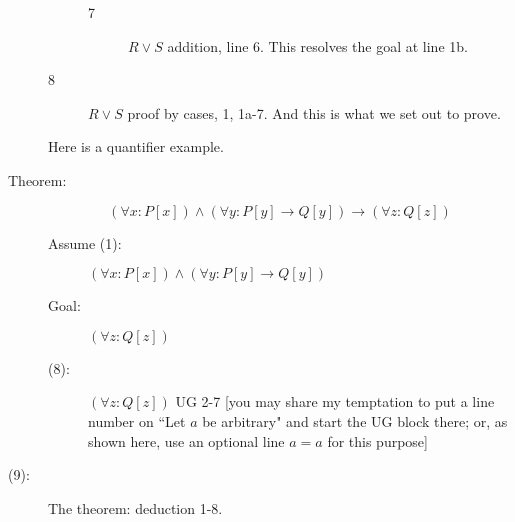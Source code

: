 \documentclass[12pt]{book}
\begin{document}
\begin{description}
\begin{description}
\begin{description}
\item[7]  $R \vee S$  addition, line 6.  This resolves the goal at line 1b.

\end{description}

\item[8]  $R \vee S$  proof by cases, 1, 1a-7.  And this is what we set out to prove.

\end{description}


\newpage


Here is a quantifier example.

\item[Theorem:]  $$(\forall x:P[x]) \wedge (\forall y:P[y] \rightarrow Q[y]) \rightarrow (\forall z:Q[z])$$

\begin{description}

\item[Assume (1):]  $(\forall x:P[x]) \wedge (\forall y:P[y] \rightarrow Q[y])$

\item[Goal:]  $(\forall z:Q[z])$


\item[(8):]  $(\forall z:Q[z])$  UG 2-7  [you may share my temptation to put a line number on ``Let $a$ be arbitrary" and start the UG block there; or, as shown here, use an optional line $a=a$ for this purpose]

\end{description}

\item[(9):]  The theorem:  deduction 1-8.

\end{description}
\end{document}
